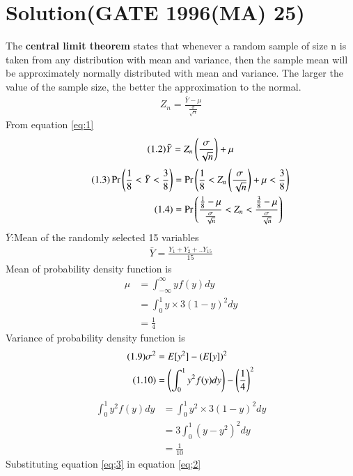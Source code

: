 \documentclass[journal,12pt,twocolumn]{IEEEtran}
\begin{document}
\section*{Solution(GATE 1996(MA) 25)}
The \textbf{central limit theorem} states that whenever a random sample of size n is taken from any distribution with mean and variance, then the sample mean will be approximately normally distributed with mean and variance. The larger the value of the sample size, the better the approximation to the normal.
\begin{align}
\tag{1.1}
    Z_{n}=\frac{\bar{Y}-\mu}{\frac{\sigma}{\sqrt{n}}}
    \label{eq:1}
\end{align}
From equation \ref{eq:1}
\begin{align}
    \tag{1.2}
    \bar{Y}=Z_{n}\left(\frac{\sigma}{\sqrt{n}}\right)+\mu
\end{align}
\begin{align}
\tag{1.3}
\Pr\left(\frac{1}{8}<\Bar{Y}<\frac{3}{8}\right)
&=\Pr\left(\frac{1}{8}<Z_{n}\left(\frac{\sigma}{\sqrt{n}}\right)+\mu<\frac{3}{8}\right)\\
\tag{1.4}  
&=\Pr\left(\frac{\frac{1}{8}-\mu}{\frac{\sigma}{\sqrt{n}}}<Z_{n}<\frac{\frac{3}{8}-\mu}{\frac{\sigma}{\sqrt{n}}}\right)
\label{eq;123}
\end{align}
$\bar{Y}$:Mean of the randomly selected 15 variables
\begin{align}
\tag{1.5}
    \bar{Y}=\frac{Y_{1}+Y_{2}+..Y_{15}}{15}
\end{align}
Mean of probability density function is
\begin{align}
\tag{1.6}
\mu&=\int_{-\infty}^{\infty}yf(y)dy\\
\tag{1.7}
    &=\int_{0}^{1}y\times 3(1-y)^{2}dy\\
\tag{1.8}
    &=\frac{1}{4}
\end{align}
Variance of probability density function is
\begin{align}
\tag{1.9}
\sigma^{2}&=E[y^{2}]-(E[y])^{2}\\
\tag{1.10}
\label{eq;2}
      &=\left(\int_{0}^{1}y^{2}f(y)dy\right) - \left(\frac{1}{4}\right)^{2}
\end{align}
\begin{align}
\tag{1.11}
    \int_{0}^{1}y^{2}f(y)dy &= \int_{0}^{1}y^{2}\times3(1-y)^{2}dy\\
\tag{1.12}
                            &=3\int_{0}^{1}(y-y^{2})^{2}dy\\
\tag{1.13}
\label{eq;3}
                            &=\frac{1}{10}
\end{align}
Substituting equation \ref{eq;3} in equation \ref{eq;2}
\end{document}
